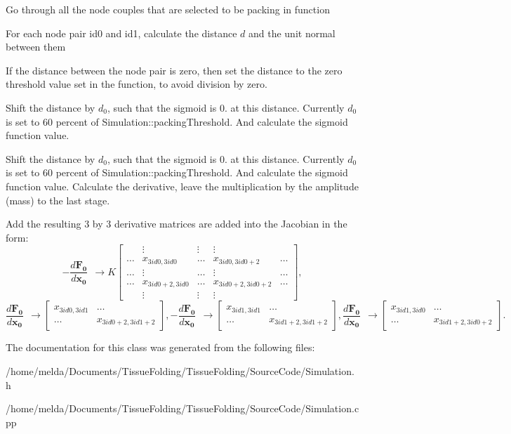 \begin{DoxyItemize}
\item Go through all the node couples that are selected to be packing in function
\item For each node pair id0 and id1, calculate the distance $ d $ and the unit normal between them
\item If the distance between the node pair is zero, then set the distance to the zero threshold value set in the function, to avoid division by zero.
\item Shift the distance by $ d_{0} $, such that the sigmoid is 0. at this distance. Currently $ d_{0} $ is set to 60 percent of Simulation\+::packing\+Threshold. And calculate the sigmoid function value.
\item Shift the distance by $ d_{0} $, such that the sigmoid is 0. at this distance. Currently $ d_{0} $ is set to 60 percent of Simulation\+::packing\+Threshold. And calculate the sigmoid function value. Calculate the derivative, leave the multiplication by the amplitude (mass) to the last stage.
\item Add the resulting 3 by 3 derivative matrices are added into the Jacobian in the form\+: \[ - \frac{d\mathbf{F_{0}}}{d\mathbf{x_{0}}} \:\: \rightarrow K \begin{bmatrix} & \vdots & \vdots & \vdots & \\ \dots & x_{3id0,3id0} & \dots & x_{3id0,3id0+2} & \dots \\ \dots & \vdots & \dots & \vdots & \dots \\ \dots & x_{3id0+2,3id0} & \dots & x_{3id0+2,3id0+2} & \dots \\ & \vdots & \vdots & \vdots & \end{bmatrix}, \] \[ \frac{d\mathbf{F_{0}}}{d\mathbf{x_{0}}} \:\: \rightarrow \begin{bmatrix} x_{3id0,3id1} & \dots\\ \dots & x_{3id0+2,3id1+2} \end{bmatrix}, -\frac{d\mathbf{F_{0}}}{d\mathbf{x_{0}}} \:\: \rightarrow \begin{bmatrix} x_{3id1,3id1} & \dots\\ \dots & x_{3id1+2,3id1+2} \end{bmatrix}, \frac{d\mathbf{F_{0}}}{d\mathbf{x_{0}}} \:\: \rightarrow \begin{bmatrix} x_{3id1,3id0} & \dots\\ \dots & x_{3id1+2,3id0+2} \end{bmatrix}. \]
\end{DoxyItemize}

The documentation for this class was generated from the following files\+:\begin{DoxyCompactItemize}
\item 
/home/melda/\+Documents/\+Tissue\+Folding/\+Tissue\+Folding/\+Source\+Code/Simulation.\+h\item 
/home/melda/\+Documents/\+Tissue\+Folding/\+Tissue\+Folding/\+Source\+Code/Simulation.\+cpp\end{DoxyCompactItemize}
